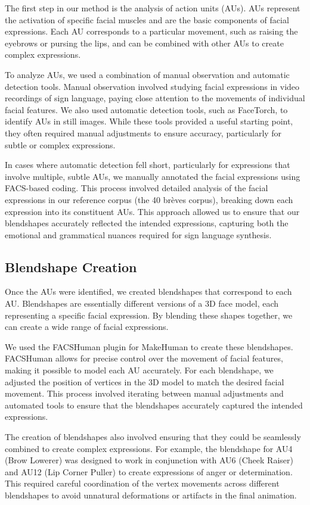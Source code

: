 \documentclass[../../main.tex]{subfiles}
\begin{document}
The first step in our method is the analysis of action units (AUs). AUs represent the activation of specific facial muscles and are the basic components of facial expressions. Each AU corresponds to a particular movement, such as raising the eyebrows or pursing the lips, and can be combined with other AUs to create complex expressions.

To analyze AUs, we used a combination of manual observation and automatic detection tools. Manual observation involved studying facial expressions in video recordings of sign language, paying close attention to the movements of individual facial features. We also used automatic detection tools, such as FaceTorch, to identify AUs in still images. While these tools provided a useful starting point, they often required manual adjustments to ensure accuracy, particularly for subtle or complex expressions.

In cases where automatic detection fell short, particularly for expressions that involve multiple, subtle AUs, we manually annotated the facial expressions using FACS-based coding. This process involved detailed analysis of the facial expressions in our reference corpus (the 40 brèves corpus), breaking down each expression into its constituent AUs. This approach allowed us to ensure that our blendshapes accurately reflected the intended expressions, capturing both the emotional and grammatical nuances required for sign language synthesis.

\subsection{Blendshape Creation}

Once the AUs were identified, we created blendshapes that correspond to each AU. Blendshapes are essentially different versions of a 3D face model, each representing a specific facial expression. By blending these shapes together, we can create a wide range of facial expressions.

We used the FACSHuman plugin for MakeHuman to create these blendshapes. FACSHuman allows for precise control over the movement of facial features, making it possible to model each AU accurately. For each blendshape, we adjusted the position of vertices in the 3D model to match the desired facial movement. This process involved iterating between manual adjustments and automated tools to ensure that the blendshapes accurately captured the intended expressions.

The creation of blendshapes also involved ensuring that they could be seamlessly combined to create complex expressions. For example, the blendshape for AU4 (Brow Lowerer) was designed to work in conjunction with AU6 (Cheek Raiser) and AU12 (Lip Corner Puller) to create expressions of anger or determination. This required careful coordination of the vertex movements across different blendshapes to avoid unnatural deformations or artifacts in the final animation.
\end{document}
